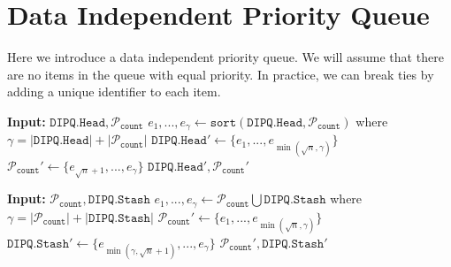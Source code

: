 \section{Data Independent Priority Queue}
Here we introduce a data independent priority queue. We will assume that there are no items in the queue
with equal priority. In practice, we can break ties by adding a unique identifier to each item.

\newcommand{\DIPQhead}{\texttt{DIPQ.Head}}
\newcommand{\DIPQstash}{\texttt{DIPQ.Stash}}
\newcommand{\DIPQcounter}{{\texttt{count}}}
\newcommand{\DIPQpartition}{\mathcal{P}}
\newcommand{\MergeFill}{\texttt{MergeFill}}
\newcommand{\Fill}{\texttt{Fill}}
\newcommand{\sqrtn}{{\sqrt{n}}}
\newcommand{\good}{\mathcal{G}}
\newcommand{\bad}{\mathcal{B}}

\begin{algorithm}
	\caption{$\MergeFill$}
	\begin{algorithmic}[1]
			\State \textbf{Input:} $\DIPQhead, \DIPQpartition_\DIPQcounter$
			\State $e_1, ..., e_\gamma \gets \texttt{sort}(\DIPQhead, \DIPQpartition_\DIPQcounter)$ where $\gamma = |\DIPQhead| + |\DIPQpartition_\DIPQcounter|$
			\State $\DIPQhead' \gets \{e_1, ..., e_{\min\left(\sqrtn, \gamma\right)}\}$
			\State $\DIPQpartition_\DIPQcounter' \gets \{e_{\sqrtn + 1}, ..., e_\gamma\}$
			\State \Return $\DIPQhead', \DIPQpartition_\DIPQcounter'$
	\end{algorithmic}
\end{algorithm}

\begin{algorithm}
	\caption{$\Fill$}
	\begin{algorithmic}[1]
			\State \textbf{Input:} $\DIPQpartition_\DIPQcounter, \DIPQstash$
			\State $e_1, ..., e_\gamma \gets \DIPQpartition_\DIPQcounter \bigcup \DIPQstash$ where $\gamma = |\DIPQpartition_\DIPQcounter| + |\DIPQstash|$
			\State $\DIPQpartition_\DIPQcounter' \gets \{e_1, ..., e_{\min(\sqrtn, \gamma)}\}$
			\State $\DIPQstash' \gets \{e_{\min(\gamma, \sqrtn + 1)}, ..., e_\gamma\}$
			\State \Return $\DIPQpartition_\DIPQcounter', \DIPQstash'$
	\end{algorithmic}
\end{algorithm}


